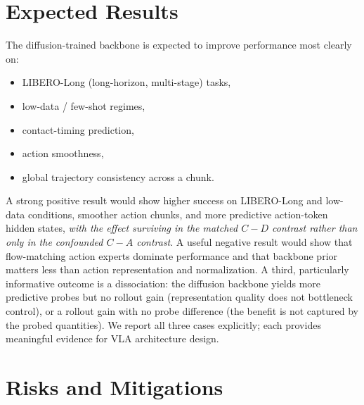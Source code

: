 \documentclass[11pt]{article}
\begin{document}
\section{Expected Results}
\label{sec:expected}

The diffusion-trained backbone is expected to improve performance most clearly on:

\begin{itemize}
    \item LIBERO-Long (long-horizon, multi-stage) tasks,
    \item low-data / few-shot regimes,
    \item contact-timing prediction,
    \item action smoothness,
    \item global trajectory consistency across a chunk.
\end{itemize}

A strong positive result would show higher success on LIBERO-Long and low-data conditions, smoother action chunks, and more predictive action-token hidden states, \emph{with the effect surviving in the matched $C - D$ contrast rather than only in the confounded $C - A$ contrast}. A useful negative result would show that flow-matching action experts dominate performance and that backbone prior matters less than action representation and normalization. A third, particularly informative outcome is a dissociation: the diffusion backbone yields more predictive probes but no rollout gain (representation quality does not bottleneck control), or a rollout gain with no probe difference (the benefit is not captured by the probed quantities). We report all three cases explicitly; each provides meaningful evidence for VLA architecture design.

\section{Risks and Mitigations}
\label{sec:risks}
\end{document}
